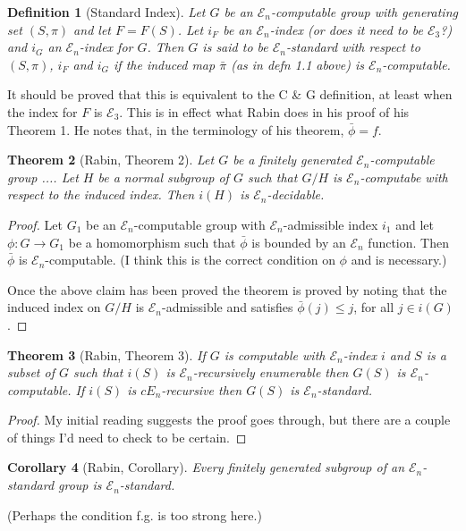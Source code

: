 \documentclass[12pt,a4paper,draft]{article}
\newcommand\cE{\mathcal{E}}
\newcommand{\maps}{\longrightarrow}
\newtheorem{theorem}{{\bf Theorem}}[section]
\newtheorem{corollary}[theorem]{{\bf Corollary}}
\newtheorem{definition}[theorem]{{\bf Definition}}
\begin{document}
\begin{definition}[Standard Index]
Let $G$ be an $\cE_n$-computable group with generating set $(S,\pi)$ and 
let $F=F(S)$. Let $i_F$ be an $\cE_n$-index (or does it need to be $\cE_3$?)
and $i_G$ an 
 $\cE_n$-index for $G$. Then $G$ is  
said to be $\cE_n${\em -standard} with respect to $(S,\pi)$, 
$i_F$ and $i_G$ if 
the induced map $\bar\pi$ (as in defn 1.1 above)  is $\cE_n$-computable.
\end{definition}

It should be proved that this is equivalent to the C \& G definition, at 
least when the index for $F$ is $\cE_3$. This is in effect what Rabin 
does in his proof of his Theorem 1. He notes that, in the terminology
of his theorem, $\bar\phi=f$. 

\begin{theorem}[Rabin, Theorem 2]
Let $G$ be a finitely generated $\cE_n$-computable group .... Let $H$ be
a normal subgroup of $G$ such that $G/H$ is $\cE_n$-computabe with respect
to the induced index. Then $i(H)$ is $\cE_n$-decidable.  
\end{theorem}
\begin{proof}
 Let $G_1$ be an $\cE_n$-computable group with 
$\cE_n$-admissible index $i_1$ and let $\phi:G\maps G_1$ be a homomorphism
such that $\bar\phi$ is bounded by an $\cE_n$ function. Then 
$\bar\phi$ is $\cE_n$-computable. (I think this is the correct condition
on $\phi$ and is necessary.)

Once the above claim has been proved the theorem is proved by noting
that the induced index on $G/H$ is $\cE_n$-admissible and satisfies  
 $\bar\phi(j)\le j$, for all $j\in i(G)$.
\end{proof}

\begin{theorem}[Rabin, Theorem 3]
If $G$ is computable with $\cE_n$-index $i$ and $S$ is a subset 
of $G$ such that $i(S)$ is $\cE_n$-recursively enumerable then 
$G(S)$ is $\cE_n$-computable. If $i(S)$ is $cE_n$-recursive then
$G(S)$ is $\cE_n$-standard. 
\end{theorem}
\begin{proof}
My initial reading suggests the proof goes through, but there are 
a couple of things I'd need to check to be certain.
\end{proof}

\begin{corollary}[Rabin, Corollary]
Every finitely generated subgroup of an $\cE_n$-standard group
is $\cE_n$-standard. 
\end{corollary}
(Perhaps the condition f.g. is too strong here.)
\end{document}
